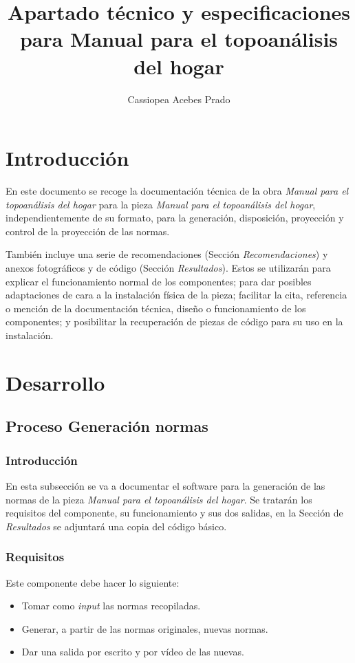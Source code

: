 \documentclass[12pt,twocolumn]{article}
\begin{document}
\onecolumn
\title{\Huge \bf Apartado técnico y especificaciones para Manual para el topoanálisis del hogar}

\author{Cassiopea Acebes Prado}

\maketitle


\tableofcontents

\newpage
\twocolumn
\section{Introducción}

En este documento se recoge la documentación técnica de la obra \textit{Manual para el topoanálisis del hogar} para la pieza \textit{Manual para el topoanálisis del hogar}, independientemente de su formato, para la generación, disposición, proyección y control de la proyección de las normas.

También incluye una serie de recomendaciones (Sección \textit{Recomendaciones}) y anexos fotográficos y de código (Sección \textit{Resultados}). Estos se utilizarán para explicar el funcionamiento normal de los componentes; para dar posibles adaptaciones de cara a la instalación física de la pieza; facilitar la cita, referencia o mención de la documentación técnica, diseño o funcionamiento de los componentes; y posibilitar la recuperación de piezas de código para su uso en la instalación.

	
\section{Desarrollo}
	\subsection{Proceso Generación normas}
	
	\subsubsection{Introducción}
	En esta subsección se va a documentar el software para la generación de las normas de la pieza \textit{Manual para el topoanálisis del hogar}. Se tratarán los requisitos del componente, su funcionamiento y sus dos salidas, en la Sección de \textit{Resultados} se adjuntará una copia del código básico.
	
	\subsubsection{Requisitos}
	Este componente debe hacer lo siguiente:
	\begin{itemize}
	\setlength\itemsep{-0.3em}
	\item Tomar como \textit{input} las normas recopiladas.
	\item Generar, a partir de las normas originales, nuevas normas.
	\item Dar una salida por escrito y por vídeo de las nuevas.
	\end{itemize}
	
\end{document}
